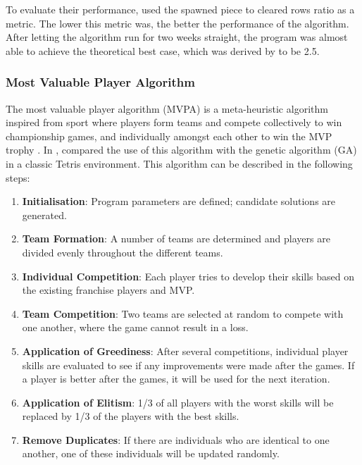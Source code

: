 \documentclass[a4paper, 12pt]{extreport}
\begin{document}
					To evaluate their performance, \citeauthor{tetris-harmony-search} \cite{tetris-harmony-search} used the spawned piece to cleared rows ratio as a metric. The lower this metric was, the better the performance of the algorithm. After letting the algorithm run for two weeks straight, the program was almost able to achieve the theoretical best case, which was derived by \citeauthor{fahey-ai} \cite{fahey-ai} to be 2.5.
		
				\subsubsection{Most Valuable Player Algorithm}
				
					The most valuable player algorithm (MVPA) is a meta-heuristic algorithm inspired from sport where players form teams and compete collectively to win championship games, and individually amongst each other to win the MVP trophy \cite{mvpa}. In \citeyear{tetris-mvpa-ga}, \citeauthor{tetris-mvpa-ga} \cite{tetris-mvpa-ga} compared the use of this algorithm with the genetic algorithm (GA) in a classic Tetris environment. This algorithm can be described in the following steps:
					
					\begin{enumerate}
						\item \textbf{Initialisation}: Program parameters are defined; candidate solutions are generated.
						\item \textbf{Team Formation}: A number of teams are determined and players are divided evenly throughout the different teams.
						\item \textbf{Individual Competition}: Each player tries to develop their skills based on the existing franchise players and MVP.
						\item \textbf{Team Competition}: Two teams are selected at random to compete with one another, where the game cannot result in a loss.
						\item \textbf{Application of Greediness}: After several competitions, individual player skills are evaluated to see if any improvements were made after the games. If a player is better after the games, it will be used for the next iteration.
						\item \textbf{Application of Elitism}: 1/3 of all players with the worst skills will be replaced by 1/3 of the players with the best skills.
						\item \textbf{Remove Duplicates}: If there are individuals who are identical to one another, one of these individuals will be updated randomly.
					\end{enumerate}
					
\end{document}
